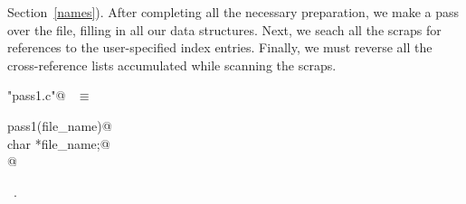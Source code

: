 \documentclass{report}
\begin{document}
Section~\ref{names}). After completing all the
necessary preparation, we make a pass over the file, filling in all
our data structures. Next, we seach all the scraps for references to
the user-specified index entries. Finally, we must reverse all the
cross-reference lists accumulated while scanning the scraps.
\begin{flushleft} \small
\begin{minipage}{\linewidth} \label{scrap32}
\verb@"pass1.c"@\nobreak\ {\footnotesize {} }$\equiv$
\vspace{-1ex}
\begin{list}{}{} \item
\mbox{}\verb@void pass1(file_name)@\\
\mbox{}\verb@     char *file_name;@\\
\mbox{}@\\
\mbox{}\verb@@{\NWsep}
\end{list}
\vspace{-1ex}
\footnotesize\addtolength{\baselineskip}{-1ex}
\begin{list}{}{\setlength{\itemsep}{-\parsep}\setlength{\itemindent}{-\leftmargin}}
\item \NWtxtFileDefBy\ .
\end{list}
\vspace{-2ex}
\footnotesize\addtolength{\baselineskip}{-1ex}
\begin{list}{}{\setlength{\itemsep}{-\parsep}\setlength{\itemindent}{-\leftmargin}}

\end{list}
\end{minipage}
\end{flushleft}
\end{document}
